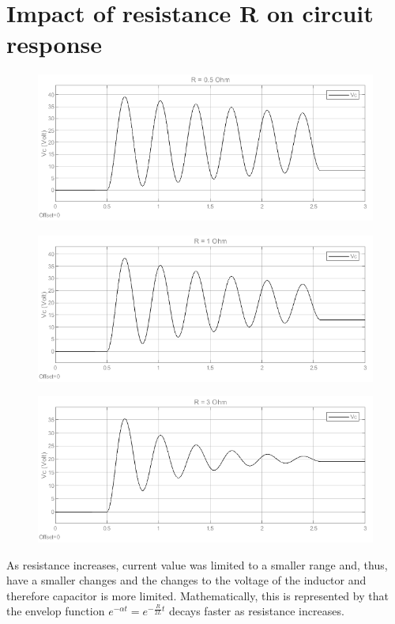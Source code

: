 \documentclass{article}
\begin{document}
\section{Impact of resistance R on circuit response}
\begin{figure}[H]
    \centering
        \includegraphics[scale=0.6]{3_0.5.png}
\end{figure}
\begin{figure}[H]
    \centering
        \includegraphics[scale=0.6]{3_1.png}
\end{figure}
\begin{figure}[H]
    \centering
        \includegraphics[scale=0.6]{3_3.png}
\end{figure}
As resistance increases, current value was limited to a smaller range and, thus, have a smaller changes and the changes to the voltage of the inductor and therefore capacitor is more limited. Mathematically, this is represented by that the envelop function $e^{-\alpha t} = e^{-\frac{R}{2L}t}$ decays faster as resistance increases.
\end{document}
